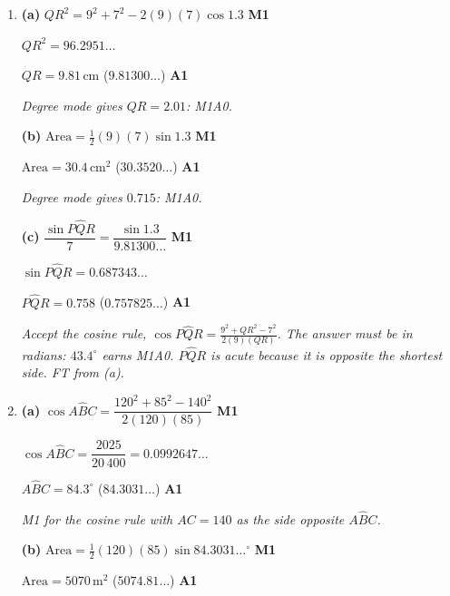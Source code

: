 \documentclass[12pt, twoside]{article}
\begin{document}
\begin{enumerate}[itemsep=0.3cm]
\emph{Feedback: carry the full calculator value of each angle forward;
round only the final answer.}

\newpage

\item[2.] [Maximum mark: 6]

\textbf{(a)} $QR^{2} = 9^{2} + 7^{2} - 2(9)(7)\cos 1.3$ \hfill \textbf{M1}

$QR^{2} = 96.2951\ldots$

$QR = 9.81\,\text{cm}$ \quad ($9.81300\ldots$) \hfill \textbf{A1}

\emph{Degree mode gives $QR = 2.01$: M1A0.}

\textbf{(b)} $\text{Area} = \frac{1}{2}(9)(7)\sin 1.3$ \hfill \textbf{M1}

$\text{Area} = 30.4\,\text{cm}^{2}$ \quad ($30.3520\ldots$) \hfill \textbf{A1}

\emph{Degree mode gives $0.715$: M1A0.}

\textbf{(c)} $\dfrac{\sin P\hat{Q}R}{7} = \dfrac{\sin 1.3}{9.81300\ldots}$ \hfill \textbf{M1}

$\sin P\hat{Q}R = 0.687343\ldots$

$P\hat{Q}R = 0.758$ \quad ($0.757825\ldots$) \hfill \textbf{A1}

\emph{Accept the cosine rule,
$\cos P\hat{Q}R = \frac{9^{2} + QR^{2} - 7^{2}}{2(9)(QR)}$. The answer
must be in radians: $43.4^\circ$ earns M1A0. $P\hat{Q}R$ is acute because
it is opposite the shortest side. FT from (a).}

\newpage

\item[3.] [Maximum mark: 6]

\textbf{(a)} $\cos A\hat{B}C = \dfrac{120^{2} + 85^{2} - 140^{2}}{2(120)(85)}$ \hfill \textbf{M1}

$\cos A\hat{B}C = \dfrac{2025}{20\,400} = 0.0992647\ldots$

$A\hat{B}C = 84.3^\circ$ \quad ($84.3031\ldots$) \hfill \textbf{A1}

\emph{M1 for the cosine rule with $AC = 140$ as the side opposite
$A\hat{B}C$.}

\textbf{(b)} $\text{Area} = \frac{1}{2}(120)(85)\sin 84.3031\ldots^\circ$ \hfill \textbf{M1}

$\text{Area} = 5070\,\text{m}^{2}$ \quad ($5074.81\ldots$) \hfill \textbf{A1}


\end{enumerate}
\end{document}
